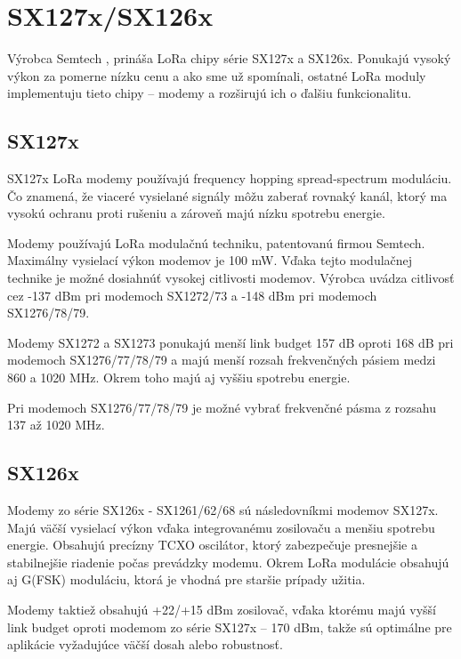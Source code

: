 \documentclass[slovak,master]{diploma}
\begin{document}
\section{SX127x/SX126x}
Výrobca Semtech \cite{semtech}, prináša LoRa chipy série SX127x a SX126x. Ponukajú vysoký výkon za pomerne nízku cenu a ako sme už spomínali, ostatné LoRa moduly 
implementuju tieto chipy -- modemy a rozširujú ich o ďalšiu funkcionalitu.

\subsection{SX127x}

SX127x LoRa modemy používajú frequency hopping spread-spectrum moduláciu. Čo znamená, že viaceré vysielané signály môžu zaberať rovnaký kanál, ktorý ma vysokú ochranu proti rušeniu a zároveň majú nízku spotrebu energie. %

Modemy používajú LoRa modulačnú techniku, patentovanú firmou Semtech. Maximálny vysielací výkon modemov je 100 mW.
Vďaka tejto modulačnej technike je možné dosiahnúť vysokej citlivosti modemov.
Výrobca uvádza citlivosť cez -137 dBm pri modemoch SX1272/73 a -148 dBm pri modemoch SX1276/78/79.

Modemy SX1272 a SX1273 ponukajú menší link budget 157 dB oproti 168 dB pri modemoch SX1276/77/78/79 a majú menší rozsah frekvenčných pásiem medzi 860 a 1020 MHz.
Okrem toho majú aj vyššiu spotrebu energie.

Pri modemoch SX1276/77/78/79 je možné vybrať frekvenčné pásma z rozsahu 137 až 1020 MHz.

\subsection{SX126x}

Modemy zo série SX126x - SX1261/62/68 sú následovníkmi modemov SX127x. Majú väčší vysielací výkon vďaka integrovanému zosilovaču a menšiu spotrebu energie. Obsahujú precízny TCXO oscilátor, 
ktorý zabezpečuje presnejšie a stabilnejšie riadenie počas prevádzky modemu. Okrem LoRa modulácie obsahujú aj G(FSK) moduláciu, ktorá je vhodná pre staršie 
prípady užitia.

Modemy taktiež obsahujú +22/+15 dBm zosilovač, vďaka ktorému majú vyšší link budget oproti modemom zo série SX127x -- 170 dBm,
takže sú optimálne pre aplikácie vyžadujúce väčší dosah alebo robustnosť.
\end{document}
